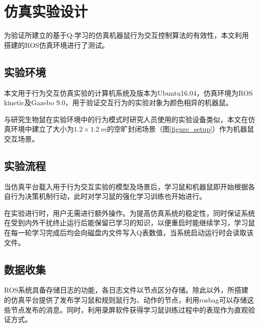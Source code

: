 \section{仿真实验设计}
为验证所建立的基于Q-学习的仿真机器鼠行为交互控制算法的有效性，本文利用搭建的ROS仿真环境进行了测试。
\subsection{实验环境}
本文用于行为交互仿真实验的计算机系统及版本为Ubuntu16.04，仿真环境为ROS kinetic及Gazebo 9.0，用于验证交互行为的实验对象为颜色相异的机器鼠。

与研究生物鼠在实验环境中的行为模式时研究人员使用的实验设备类似，本文在仿真环境中建立了大小为$1.2\times1.2~m$的空旷封闭场景（图\ref{figure_setup}）作为机器鼠交互场景。
\subsection{实验流程}
当仿真平台载入用于行为交互实验的模型及场景后，学习鼠和机器鼠即开始根据各自行为决策机制行动，此时对学习鼠的强化学习训练也开始进行。%

在实验进行时，用户无需进行额外操作。为提高仿真系统的稳定性，同时保证系统在受到内外干扰终止运行后能保留已学习的知识，以便重启时能继续学习，学习鼠在每一轮学习完成后均会向磁盘内文件写入Q表数值，当系统启动运行时会读取该文件。
\subsection{数据收集}
ROS系统具备存储日志的功能，各日志文件以节点区分存储。除此以外，所搭建的仿真平台提供了发布学习鼠和规则鼠行为、动作的节点，利用rosbag可以存储这些节点发布的消息。同时，利用录屏软件获得学习鼠训练过程中的表现作为直观验证方式。

